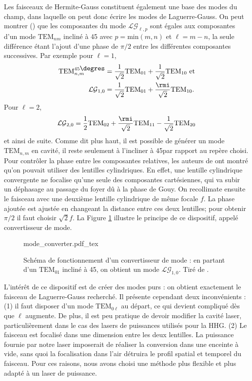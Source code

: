 Les faisceaux de Hermite-Gauss constituent également une base des modes du champ, dans laquelle on peut donc écrire les modes de Laguerre-Gauss. On peut montrer () que les composantes du mode $\mathcal{LG}_{\ell,p}$ sont égales aux composantes d'un mode $\mbox{TEM}_{nm}$ incliné à 45\degres{} avec $p = \mathrm{min}(m,n)$ et $\ell=m-n$, la seule différence étant l'ajout d'une phase de $\pi/2$ entre les différentes composantes successives. Par exemple pour $\ell = 1$,
\begin{align*}
\mbox{TEM}_{n,m}^{45\mbox{\degres}}&=\frac{1}{\sqrt{2}}\mbox{TEM}_{01}+\frac{1}{\sqrt{2}}\mbox{TEM}_{10} \mbox{ et}\\
\mathcal{LG}_{1,0}&=\frac{1}{\sqrt{2}}\mbox{TEM}_{01}+\frac{\rmi}{\sqrt{2}}\mbox{TEM}_{10}.
\end{align*}
Pour $\ell = 2$, 
\begin{equation*}
\mathcal{LG}_{2,0}=\frac{1}{2}\mbox{TEM}_{02}+\frac{\rmi}{\sqrt{2}}\mbox{TEM}_{11}-\frac{1}{\sqrt{2}}\mbox{TEM}_{20}
\end{equation*}
et ainsi de suite.
Comme dit plus haut, il est possible de générer un mode $\mbox{TEM}_{n,m}$ en cavité, il reste seulement à l'incliner à 45\degres par rapport au repère choisi. Pour contrôler la phase entre les composantes relatives, les auteurs de  ont montré qu'on pouvait utiliser des lentilles cylindriques. En effet, une lentille cylindrique convergente ne focalise qu'une seule des composantes cartésiennes, qui va subir un déphasage au passage du foyer dû à la phase de Gouy. On recollimate ensuite le faisceau avec une deuxième lentille cylindrique de même focale $f$. La phase ajoutée est ajustée en changeant la distance entre ces deux lentilles; pour obtenir $\pi/2$ il faut choisir $\sqrt{2}f$. La Figure \ref{Fig:Modeconv} illustre le principe de ce dispositif, appelé convertisseur de mode.

\begin{figure}[!ht]
\centering
\def\svgwidth{0.5\columnwidth}
{mode_converter.pdf_tex}
\caption{Schéma de fonctionnement d'un convertisseur de mode : en partant d'un $\mbox{TEM}_{01}$ incliné à 45\degres, on obtient un mode $\mathcal{LG}_{1,0}$. Tiré de .}
\label{Fig:Modeconv}
\end{figure}

L'intérêt de ce dispositif est de créer des modes purs : on obtient exactement le faisceau de Laguerre-Gauss recherché. Il présente cependant deux inconvénients : (1) il faut disposer d'un mode $\mbox{TEM}_{0\ell}$ au départ, ce qui devient compliqué dès que $\ell$ augmente. De plus, il est peu pratique de devoir modifier la cavité laser, particulièrement dans le cas des lasers de puissances utilisés pour la HHG. (2) Le faisceau est focalisé dans une dimension entre les deux lentilles. La puissance fournie par notre laser imposerait de réaliser la conversion dans une enceinte à vide, sans quoi la focalisation dans l'air détruira le profil spatial et temporel du faisceau. Pour ces raisons, nous avons choisi une méthode plus flexible et plus adapté à un laser de puissance.


